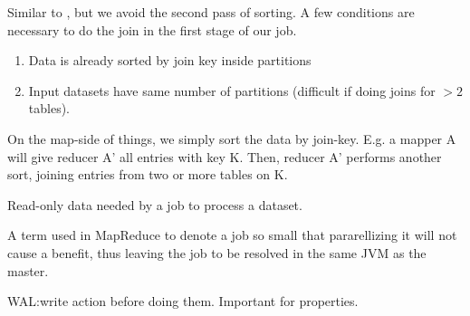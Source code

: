 \begin{definition}\label{def:mapjoin}
    Similar to , but we avoid the second pass of sorting.
    A few conditions are necessary to do the join in the first stage of our job.
    \begin{enumerate}
        \item Data is already sorted by join key inside partitions
        \item Input datasets have same number of partitions (difficult if doing joins 
            for $> 2$ tables).
    \end{enumerate}
\end{definition}

\begin{definition}\label{def:reducejoin}
    On the map-side of things, we simply sort the data by join-key. E.g. a mapper A
    will give reducer A' all entries with key K. Then, reducer A' performs another sort,
    joining entries from two or more tables on K.
\end{definition}

\begin{definition}\label{def:sidedata}
    Read-only data needed by a job to process a dataset.
\end{definition}

\begin{definition}\label{def:ubertask}
    A term used in MapReduce to denote a job so small that pararellizing it
    will not cause a benefit, thus leaving the job to be resolved in the same JVM 
    as the master.
\end{definition}

\begin{definition}\label{def:WAL}
    WAL:\@ write action before doing them. Important for  properties.
\end{definition}
